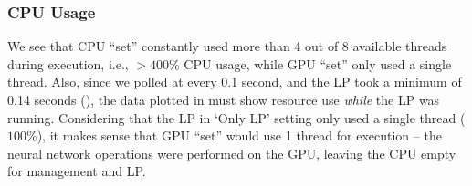 \subsubsection{CPU Usage}
We see that CPU ``set'' constantly used more than 4 out of 8 available threads during execution, i.e., $>400\%$ CPU usage, while GPU ``set'' only used a single thread. Also, since we polled at every 0.1 second, and the LP took a minimum of 0.14 seconds (), the data plotted in  must show resource use \textit{while} the LP was running. Considering that the LP in `Only LP' setting only used a single thread ($100\%$), it makes sense that GPU ``set'' would use 1 thread for execution -- the neural network operations were performed on the GPU, leaving the CPU empty for management and LP. 
